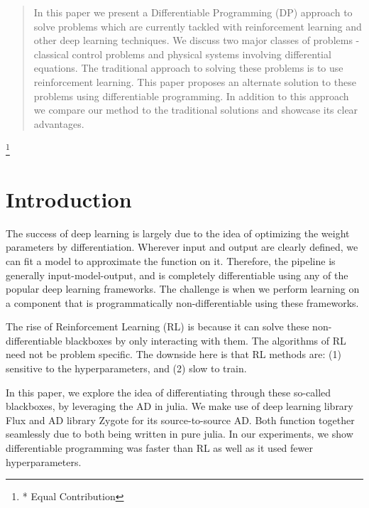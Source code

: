 \documentclass{juliacon}
\begin{document}


\maketitle

\begin{abstract}
In this paper we present a Differentiable Programming (DP) approach to solve problems which are currently tackled with reinforcement learning and other deep learning techniques. We discuss two major classes of problems - classical control problems and physical systems involving differential equations. The traditional approach to solving these problems is to use reinforcement learning. This paper proposes an alternate solution to these problems using differentiable programming. In addition to this approach we compare our method to the traditional solutions and showcase its clear advantages.

\headingtable

\end{abstract}

\let\thefootnote\relax\footnote{* Equal Contribution}

\section{Introduction}
\label{intro}

The success of deep learning is largely due to the idea of optimizing the weight parameters by differentiation. Wherever input and output are clearly defined, we can fit a model to approximate the function on it. Therefore, the pipeline is generally input-model-output, and is completely differentiable using any of the popular deep learning frameworks. The challenge is when we perform learning on a component that is programmatically non-differentiable using these frameworks.

The rise of Reinforcement Learning (RL) is because it can solve these non-differentiable blackboxes by only interacting with them. The algorithms of RL need not be problem specific. The downside here is that RL methods are: (1) sensitive to the hyperparameters, and (2) slow to train.

In this paper, we explore the idea of differentiating through these so-called blackboxes, by leveraging the AD in julia\cite{bezanson2017julia}.  We make use of deep learning library Flux \cite{innes:2018} and AD library Zygote \cite{Zygote.jl-2018} for its source-to-source AD. Both function together seamlessly due to both being written in pure julia. In our experiments, we show differentiable programming was faster than RL as well as it used fewer hyperparameters.
\end{document}
